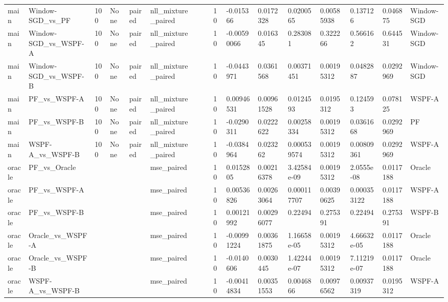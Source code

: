 \begin{tabular}{llllllllllllllll}
main & Window-SGD\_vs\_PF & 100 & None & paired & nll\_mixture\_paired &  &  & 10 & -0.015366 & 0.0172328 & 0.0200565 & 0.00585938 & 0.137126 & 0.046875 & Window-SGD \\
main & Window-SGD\_vs\_WSPF-A & 100 & None & paired & nll\_mixture\_paired &  &  & 10 & -0.00590066 & 0.016345 & 0.283081 & 0.322266 & 0.566162 & 0.644531 & Window-SGD \\
main & Window-SGD\_vs\_WSPF-B & 100 & None & paired & nll\_mixture\_paired &  &  & 10 & -0.0443971 & 0.0361568 & 0.00371451 & 0.00195312 & 0.0482887 & 0.0292969 & Window-SGD \\
main & PF\_vs\_WSPF-A & 100 & None & paired & nll\_mixture\_paired &  &  & 10 & 0.00946531 & 0.00961528 & 0.0124593 & 0.0195312 & 0.124593 & 0.078125 & WSPF-A \\
main & PF\_vs\_WSPF-B & 100 & None & paired & nll\_mixture\_paired &  &  & 10 & -0.0290311 & 0.0222622 & 0.00258334 & 0.00195312 & 0.0361668 & 0.0292969 & PF \\
main & WSPF-A\_vs\_WSPF-B & 100 & None & paired & nll\_mixture\_paired &  &  & 10 & -0.0384964 & 0.023262 & 0.000539574 & 0.00195312 & 0.00809361 & 0.0292969 & WSPF-A \\
oracle & PF\_vs\_Oracle &  &  &  & mse\_paired &  &  & 10 & 0.0152805 & 0.00216378 & 3.42584e-09 & 0.00195312 & 2.0555e-08 & 0.0117188 & Oracle \\
oracle & PF\_vs\_WSPF-A &  &  &  & mse\_paired &  &  & 10 & 0.00536826 & 0.00263064 & 0.000117707 & 0.00390625 & 0.000353122 & 0.0117188 & WSPF-A \\
oracle & PF\_vs\_WSPF-B &  &  &  & mse\_paired &  &  & 10 & 0.00121992 & 0.00296077 & 0.22494 & 0.275391 & 0.22494 & 0.275391 & WSPF-B \\
oracle & Oracle\_vs\_WSPF-A &  &  &  & mse\_paired &  &  & 10 & -0.00991224 & 0.00361875 & 1.16658e-05 & 0.00195312 & 4.66632e-05 & 0.0117188 & Oracle \\
oracle & Oracle\_vs\_WSPF-B &  &  &  & mse\_paired &  &  & 10 & -0.0140606 & 0.0030445 & 1.42244e-07 & 0.00195312 & 7.11219e-07 & 0.0117188 & Oracle \\
oracle & WSPF-A\_vs\_WSPF-B &  &  &  & mse\_paired &  &  & 10 & -0.00414834 & 0.00351553 & 0.0046866 & 0.00976562 & 0.00937319 & 0.0195312 & WSPF-A \\
\hline
\end{tabular}
